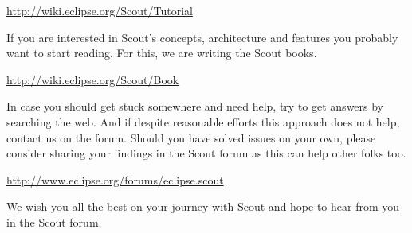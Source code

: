 \documentclass{article}
\begin{document}
\url{http://wiki.eclipse.org/Scout/Tutorial}

If you are interested in Scout's concepts, architecture and features you probably want to start reading. 
For this, we are writing the Scout books. 

\url{http://wiki.eclipse.org/Scout/Book}

In case you should get stuck somewhere and need help, try to get answers by searching the web. 
And if despite reasonable efforts this approach does not help, contact us on the forum. 
Should you have solved issues on your own, please consider sharing your findings in the Scout forum as this can help other folks too. 

\url{http://www.eclipse.org/forums/eclipse.scout}

We wish you all the best on your journey with Scout and hope to hear from you in the Scout forum.
\end{document}
